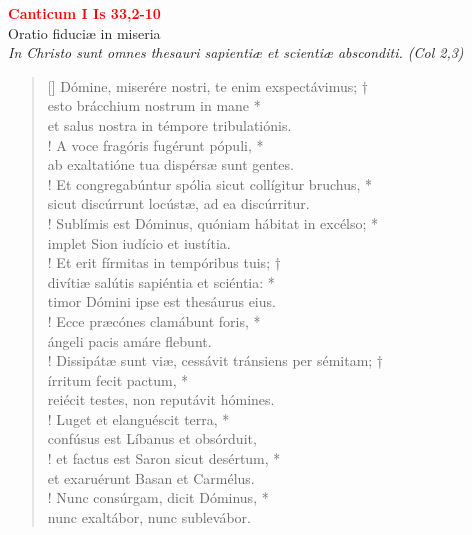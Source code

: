 


\def\greinitialformat#1{%
{\fontsize{39}{39}\selectfont #1}%
}




\vspace{0.3cm}
\begin{center}
 \textcolor{red}{\large \bf Canticum I Is 33,2-10}\\
Oratio fiduciæ in miseria\\
\textit{\small In Christo sunt omnes thesauri sapientiæ et scientiæ absconditi. (Col 2,3)}
\end{center}
\begin{verse}[\versewidth]
Dómine, miserére nostri, te enim exspectávimus; †\\
esto brácchium nostrum in mane *\\
et salus nostra in témpore tribulatiónis.\\!
\vin A voce fragóris fugérunt pópuli, *\\
\vin ab exaltatióne tua dispérsæ sunt gentes.\\!
Et congregabúntur spólia sicut collígitur bruchus, *\\
sicut discúrrunt locústæ, ad ea discúrritur.\\!
\vin Sublímis est Dóminus, quóniam hábitat in excélso; *\\
\vin implet Sion iudício et iustítia.\\!
Et erit fírmitas in tempóribus tuis; †\\
divítiæ salútis sapiéntia et sciéntia: *\\
timor Dómini ipse est thesáurus eius.\\!
\vin Ecce præcónes clamábunt foris, *\\
\vin ángeli pacis amáre flebunt.\\!
Dissipátæ sunt viæ, cessávit tránsiens per sémitam; †\\
írritum fecit pactum, *\\
reiécit testes, non reputávit hómines.\\!
\vin Luget et elanguéscit terra, *\\
\vin confúsus est Líbanus et obsórduit,\\!
et factus est Saron sicut desértum, *\\
et exaruérunt Basan et Carmélus.\\!
\vin Nunc consúrgam, dicit Dóminus, *\\
\vin nunc exaltábor, nunc sublevábor.\\
\end{verse}
\vspace{1cm}


